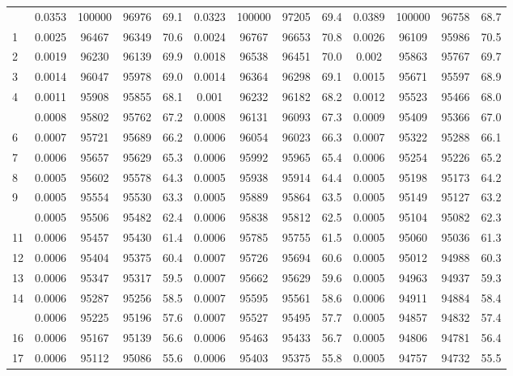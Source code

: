 \documentclass[
  14pt,
]{article}
\begin{document}
\begin{longtable}[t]{lcccccccccccc}
\endfoot
\bottomrule
\endlastfoot
0 & 0.0353 & 100000 & 96976 & 69.1 & 0.0323 & 100000 & 97205 & 69.4 & 0.0389 & 100000 & 96758 & 68.7\\
1 & 0.0025 & 96467 & 96349 & 70.6 & 0.0024 & 96767 & 96653 & 70.8 & 0.0026 & 96109 & 95986 & 70.5\\
2 & 0.0019 & 96230 & 96139 & 69.9 & 0.0018 & 96538 & 96451 & 70.0 & 0.002 & 95863 & 95767 & 69.7\\
3 & 0.0014 & 96047 & 95978 & 69.0 & 0.0014 & 96364 & 96298 & 69.1 & 0.0015 & 95671 & 95597 & 68.9\\
4 & 0.0011 & 95908 & 95855 & 68.1 & 0.001 & 96232 & 96182 & 68.2 & 0.0012 & 95523 & 95466 & 68.0\\
\addlinespace
5 & 0.0008 & 95802 & 95762 & 67.2 & 0.0008 & 96131 & 96093 & 67.3 & 0.0009 & 95409 & 95366 & 67.0\\
6 & 0.0007 & 95721 & 95689 & 66.2 & 0.0006 & 96054 & 96023 & 66.3 & 0.0007 & 95322 & 95288 & 66.1\\
7 & 0.0006 & 95657 & 95629 & 65.3 & 0.0006 & 95992 & 95965 & 65.4 & 0.0006 & 95254 & 95226 & 65.2\\
8 & 0.0005 & 95602 & 95578 & 64.3 & 0.0005 & 95938 & 95914 & 64.4 & 0.0005 & 95198 & 95173 & 64.2\\
9 & 0.0005 & 95554 & 95530 & 63.3 & 0.0005 & 95889 & 95864 & 63.5 & 0.0005 & 95149 & 95127 & 63.2\\
\addlinespace
10 & 0.0005 & 95506 & 95482 & 62.4 & 0.0006 & 95838 & 95812 & 62.5 & 0.0005 & 95104 & 95082 & 62.3\\
11 & 0.0006 & 95457 & 95430 & 61.4 & 0.0006 & 95785 & 95755 & 61.5 & 0.0005 & 95060 & 95036 & 61.3\\
12 & 0.0006 & 95404 & 95375 & 60.4 & 0.0007 & 95726 & 95694 & 60.6 & 0.0005 & 95012 & 94988 & 60.3\\
13 & 0.0006 & 95347 & 95317 & 59.5 & 0.0007 & 95662 & 95629 & 59.6 & 0.0005 & 94963 & 94937 & 59.3\\
14 & 0.0006 & 95287 & 95256 & 58.5 & 0.0007 & 95595 & 95561 & 58.6 & 0.0006 & 94911 & 94884 & 58.4\\
\addlinespace
15 & 0.0006 & 95225 & 95196 & 57.6 & 0.0007 & 95527 & 95495 & 57.7 & 0.0005 & 94857 & 94832 & 57.4\\
16 & 0.0006 & 95167 & 95139 & 56.6 & 0.0006 & 95463 & 95433 & 56.7 & 0.0005 & 94806 & 94781 & 56.4\\
17 & 0.0006 & 95112 & 95086 & 55.6 & 0.0006 & 95403 & 95375 & 55.8 & 0.0005 & 94757 & 94732 & 55.5\\

\end{longtable}
\end{document}
